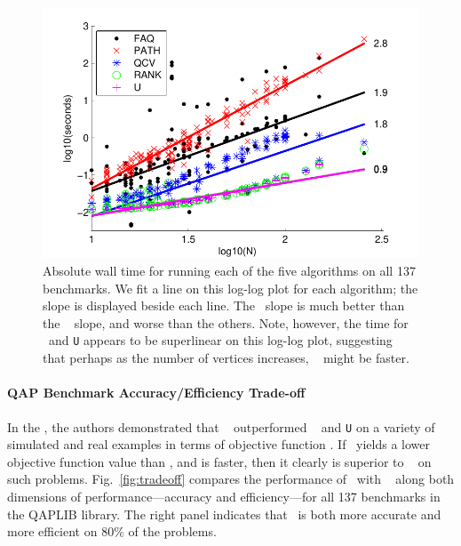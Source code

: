 \documentclass{article} %
\begin{document}
\begin{figure}
	\centering
		\includegraphics[width=0.4\linewidth]{../figs/allEfficiency.pdf}
	\caption{Absolute wall time for running each of the five algorithms on all 137 benchmarks. We fit a line on this log-log plot for each algorithm; the slope is displayed beside each line. The \FAQ\  slope is much better than the \Path~ slope, and worse than the others.  Note, however, the time for \Rank~and \texttt{U} appears to be superlinear on this log-log plot, suggesting that perhaps as the number of vertices increases, \Path~ might be faster. }
	\label{fig:allEfficiency}
	\vspace{-10pt}
\end{figure}



\vspace{-5pt}
\paragraph{QAP Benchmark Accuracy/Efficiency Trade-off} %
\label{sub:tradeoff}


In the \Path, the authors demonstrated that \Path~ outperformed \Qcv~ and \texttt{U} on a variety of simulated and real examples in terms of objective function \cite{Zaslavskiy2009}.  If \FAQ\  yields a lower objective function value than \FAQ, and is faster, then it clearly is superior to \Path~ on such problems.  Fig.\ \ref{fig:tradeoff} compares the performance of \FAQ\  with \Path~ along both dimensions of performance---accuracy and efficiency---for all 137 benchmarks in the QAPLIB library.  The right panel indicates that \FAQ\  is both more accurate and more efficient on $80\%$ of the problems.
\end{document}
